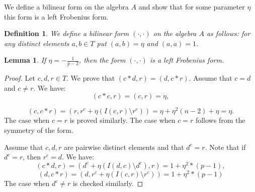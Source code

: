 \documentclass[12pt]{article}
\newtheorem{lem}{Lemma}
\newtheorem{defi}{Definition}
\begin{document}
We define a bilinear form on the algebra $A$ and show that for some parameter $\eta$ this form is a left Frobenius form.

\begin{defi}
	We define a bilinear form $(\cdot,\cdot)$ on the algebra $A$ as follows: for any distinct elements $a,b\in T$ put $(a,b)=\eta$ and $(a,a)=1$.
\end{defi}

\begin{lem}\label{twofform}
	If $\eta=-\frac{1}{p-2}$, then the form $(\cdot,\cdot)$ is a left Frobenius form.
	\end{lem}
\begin{proof}
Let $c,d,r\in T$. We prove that $(c*d,r)=(d,c*r)$.
Assume that $c=d$ and $c\neq r$. We have:
$$(c*c,r)=(c,r)=\eta,$$

$$(c,c*r)=(r,r^c+\eta(I(c,r)\setminus r^c))=\eta+\eta^2(n-2)+\eta=\eta.$$
The case when $c=r$ is proved similarly. The case when $c=r$ follows from the symmetry of the form.

Assume that $c,d,r$ are pairwise distinct elements and that $d^c=r$. Note that if $d^c=r$, then $r^c=d$. We have: $$(c*d,r)=(d^c+\eta(I(d,c)\setminus d^c),r)=1+\eta^2*(p-1),$$
$$(d,c*r)=(d,r^c+\eta(I(c,r)\setminus r^c))=1+\eta^2*(p-1)$$
The case when $d^c\neq r$ is checked similarly.

	
	
\end{proof}


%		
%		
%		
		
\end{document}
